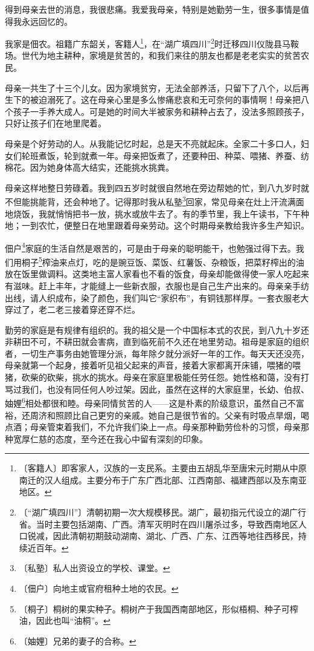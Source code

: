 \documentclass[12pt,UTF-8,openany]{ctexbook}
\begin{document}
\begin{normalsize}
    
    得到母亲去世的消息，我很悲痛。我爱我母亲，特别是她勤劳一生，很多事情是值得我永远回忆的。
    
    我家是佃农。祖籍广东韶关，客籍人\footnote{〔客籍人〕即客家人，汉族的一支民系。主要由五胡乱华至唐宋元时期从中原南迁的汉人组成。主要分布于广东广西北部、江西南部、福建西部以及东南亚地区。}，在“湖广填四川”\footnote{〔“湖广填四川”〕清朝初期一次大规模移民。湖广，最初指元代设立的湖广行省。当时主要包括湖南、广西。清军灭明时在四川屠杀过多，导致西南地区人口锐减，因此清朝初期鼓动湖南、湖北、广西、广东、江西等地往西移民，持续近百年。}时迁移四川仪陇县马鞍场。世代为地主耕种，家境是贫苦的，和我们来往的朋友也都是老老实实的贫苦农民。
    
    母亲一共生了十三个儿女。因为家境贫穷，无法全部养活，只留下了八个，以后再生下的被迫溺死了。这在母亲心里是多么惨痛悲哀和无可奈何的事情啊！母亲把八个孩子一手养大成人。可是她的时间大半被家务和耕种占去了，没法多照顾孩子，只好让孩子们在地里爬着。
    
    母亲是个好劳动的人。从我能记忆时起，总是天不亮就起床。全家二十多口人，妇女们轮班煮饭，轮到就煮一年。母亲把饭煮了，还要种田、种菜、喂猪、养蚕、纺棉花。因为她身体高大结实，还能挑水挑粪。
    
    母亲这样地整日劳碌着。我到四五岁时就很自然地在旁边帮她的忙，到八九岁时就不但能挑能背，还会种地了。记得那时我从私塾\footnote{〔私塾〕私人出资设立的学校、课堂。}回家，常见母亲在灶上汗流满面地烧饭，我就悄悄把书一放，挑水或放牛去了。有的季节里，我上午读书，下午种地；一到农忙，便整日在地里跟着母亲劳动。这个时期母亲教给我许多生产知识。
    
    佃户\footnote{〔佃户〕向地主或官府租种土地的农民。}家庭的生活自然是艰苦的，可是由于母亲的聪明能干，也勉强过得下去。我们用桐子\footnote{〔桐子〕桐树的果实种子。桐树产于我国西南部地区，形似梧桐、种子可榨油，因此也叫“油桐”。}榨油来点灯，吃的是豌豆饭、菜饭、红薯饭、杂粮饭，把菜籽榨出的油放在饭里做调料。这类地主富人家看也不看的饭食，母亲却能做得使一家人吃起来有滋味。赶上丰年，才能缝上一些新衣服，衣服也是自己生产出来的。母亲亲手纺出线，请人织成布，染了颜色，我们叫它“家织布”，有铜钱那样厚。一套衣服老大穿过了，老二老三接着穿还穿不烂。
    
    勤劳的家庭是有规律有组织的。我的祖父是一个中国标本式的农民，到八九十岁还非耕田不可，不耕田就会害病，直到临死前不久还在地里劳动。祖母是家庭的组织者，一切生产事务由她管理分派，每年除夕就分派好一年的工作。每天天还没亮，母亲就第一个起身，接着听见祖父起来的声音，接着大家都离开床铺，喂猪的喂猪，砍柴的砍柴，挑水的挑水。母亲在家庭里极能任劳任怨。她性格和蔼，没有打骂过我们，也没有同任何人吵过架。因此，虽然在这样的大家庭里，长幼、伯叔、妯娌\footnote{〔妯娌〕兄弟的妻子的合称。}相处都很和睦。母亲同情贫苦的人——这是朴素的阶级意识，虽然自己不富裕，还周济和照顾比自己更穷的亲戚。她自己是很节省的。父亲有时吸点旱烟，喝点酒；母亲管束着我们，不允许我们染上一点。母亲那种勤劳俭朴的习惯，母亲那种宽厚仁慈的态度，至今还在我心中留有深刻的印象。
    

\end{normalsize}
\end{document}
